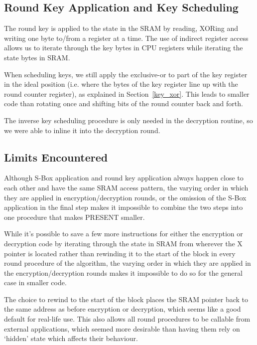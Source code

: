 \documentclass[11pt]{llncs2e} %
\begin{document}
\subsection{Round Key Application and Key Scheduling}
The round key is applied to the state in the SRAM by reading, XORing and writing one byte to/from a register at a time.
The use of indirect register access allows us to iterate through the key bytes in CPU registers while iterating the state bytes in SRAM.

When scheduling keys, we still apply the exclusive-or to part of the key register in the ideal position (i.e. where the bytes of the key register line up with the round counter register), as explained in Section~\ref{key_xor}.
This leads to smaller code than rotating once and shifting bits of the round counter back and forth.

The inverse key scheduling procedure is only needed in the decryption routine, so we were able to inline it into the decryption round.

\subsection{Limits Encountered}
Although S-Box application and round key application always happen close to each other and have the same SRAM access pattern, the varying order in which they are applied in encryption/decryption rounds, or the omission of the S-Box application in the final step makes it impossible to combine the two steps into one procedure that makes PRESENT smaller.

While it's possible to save a few more instructions for either the encryption or decryption code by iterating through the state in SRAM from wherever the X pointer is located rather than rewinding it to the start of the block in every round procedure of the algorithm, the varying order in which they are applied in the encryption/decryption rounds makes it impossible to do so for the general case in smaller code.

The choice to rewind to the start of the block places the SRAM pointer back to the same address as before encryption or decryption, which seems like a good default for real-life use.
This also allows all round procedures to be callable from external applications, which seemed more desirable than having them rely on `hidden' state which affects their behaviour.
\end{document}
